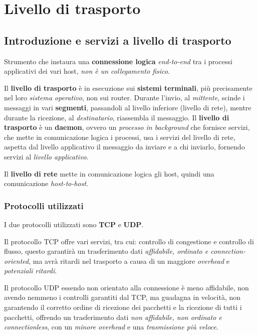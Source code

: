 \section{Livello di trasporto}

\subsection{Introduzione e servizi a livello di trasporto}
Strumento che instaura una \textbf{connessione logica} \textit{end-to-end} tra i processi applicativi dei vari host, \textit{non è un collegamento fisico}.

Il \textbf{livello di trasporto} è in esecuzione sui \textbf{sistemi terminali}, più precisamente nel loro \textit{sistema operativo}, non sui router.
Durante l'invio, al \textit{mittente}, scinde i messaggi in vari \textbf{segmenti}, passandoli al livello inferiore (livello di rete), mentre durante la ricezione, al \textit{destinatario}, riassembla il messaggio.
Il \textbf{livello di trasporto} è un \textbf{daemon}, ovvero un \textit{processo in background} che fornisce servizi, che mette in comunicazione logica i processi, usa i servizi del livello di rete, aspetta dal livello applicativo il messaggio da inviare e a chi inviarlo, fornendo servizi al \textit{livello applicativo}.

Il \textbf{livello di rete} mette in comunicazione logica gli host, quindi una comunicazione \textit{host-to-host}.

\subsubsection{Protocolli utilizzati}
I due protocolli utilizzati sono \textbf{TCP} e \textbf{UDP}.

Il protocollo TCP offre vari servizi, tra cui: controllo di congestione e controllo di flusso, questo garantirà un trasferimento dati \textit{affidabile, ordinato e connection-oriented}, ma avrà ritardi nel trasporto a causa di un maggiore \textit{overhead} e \textit{potenziali ritardi}.

Il protocollo UDP essendo non orientato alla connessione è meno affidabile, non avendo nemmeno i controlli garantiti dal TCP, ma guadagna in velocità, non garantendo il corretto ordine di ricezione dei pacchetti e la ricezione di tutti i pacchetti, offrendo un trasferimento dati \textit{non affidabile, non ordinato e connectionless}, con un \textit{minore overhead} e una \textit{trasmissione più veloce}.

